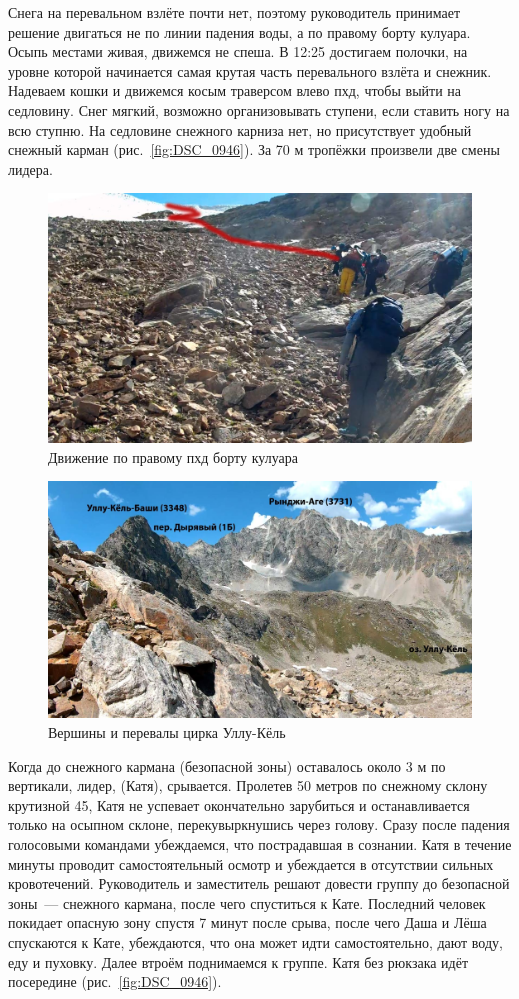 Снега на перевальном взлёте почти нет, поэтому руководитель принимает решение двигаться не по линии падения воды, а по правому борту кулуара. Осыпь местами живая, движемся не спеша. В 12:25 достигаем полочки, на уровне которой начинается самая крутая часть перевального взлёта и снежник. Надеваем кошки и движемся косым траверсом влево пхд, чтобы выйти на седловину. Снег мягкий, возможно организовывать ступени, если ставить ногу на всю ступню. На седловине снежного карниза нет, но присутствует удобный снежный карман (рис.~\ref{fig:DSC_0946}). За 70 м тропёжки произвели две смены лидера.

\begin{figure}[h!]
	\centering
	\includegraphics[width=0.7\linewidth]{../pics/20aug3.jpg}
	\caption{Движение по правому пхд борту кулуара}
	\label{fig:20aug3.jpg}
\end{figure}

\begin{figure}[h!]
	\centering
	\includegraphics[width=0.7\linewidth]{../pics/20aug4.jpg}
	\caption{Вершины и перевалы цирка Уллу-Кёль}
	\label{fig:20aug4.jpg}
\end{figure}

Когда до снежного кармана (безопасной зоны) оставалось около 3 м по вертикали, лидер, (Катя), срывается. Пролетев 50 метров по снежному склону крутизной 45\degree, Катя не успевает окончательно зарубиться и останавливается только на осыпном склоне, перекувыркнушись через голову. Сразу после падения голосовыми командами убеждаемся, что пострадавшая в сознании. Катя в течение минуты проводит самостоятельный осмотр и убеждается в отсутствии сильных кровотечений. Руководитель и заместитель решают довести группу до безопасной зоны~--- снежного кармана, после чего спуститься к Кате. Последний человек покидает опасную зону спустя 7 минут после срыва, после чего Даша и Лёша спускаются к Кате, убеждаются, что она может идти самостоятельно, дают воду, еду и пуховку. Далее втроём поднимаемся к группе. Катя без рюкзака идёт посередине (рис.~\ref{fig:DSC_0946}).


